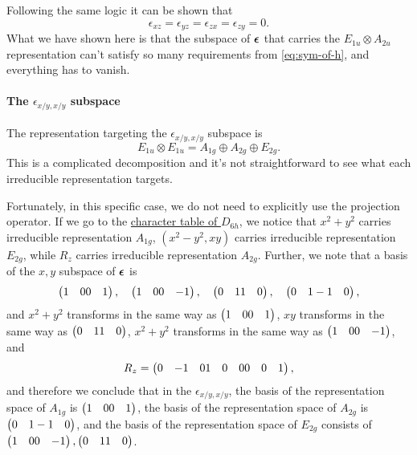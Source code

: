 \documentclass[hyperref, a4paper, 12pt]{article}
\def\\{}%
\begin{document}
Following the same logic it can be shown that 
\begin{equation}
    \epsilon_{xz} = \epsilon_{yz} = \epsilon_{zx} = \epsilon_{zy} = 0.
\end{equation}
What we have shown here is that the subspace of $\vb*{\epsilon}$ that carries the 
$E_{1u} \otimes A_{2u}$ representation can't satisfy so many requirements from \eqref{eq:sym-of-h},
and everything has to vanish.

\paragraph*{The $\epsilon_{x/y, x/y}$ subspace}

The representation targeting the $\epsilon_{x/y, x/y}$ subspace is 
\begin{equation}
    E_{1u} \otimes E_{1u} = A_{1g} \oplus A_{2g} \oplus E_{2g}.
\end{equation}
This is a complicated decomposition and it's not straightforward
to see what each irreducible representation targets.

Fortunately, in this specific case, we do not need to explicitly use the projection operator.
If we go to the \href{http://symmetry.constructor.university/cgi-bin/group.cgi?group=606&option=4}{character table of $D_{6h}$},
we notice that $x^2 + y^2$ carries irreducible representation $A_{1g}$,
$(x^2 - y^2, xy)$ carries irreducible representation $E_{2g}$,
while $R_z$ carries irreducible representation $A_{2g}$.
Further, we note that a basis of the $x, y$ subspace of $\vb*{\epsilon}$ is 
\[
    \pmqty{1 & 0 \\ 0 & 1}, \quad \pmqty{1 & 0 \\ 0 & -1}, \quad 
    \pmqty{0 & 1 \\ 1 & 0}, \quad \pmqty{0 & 1 \\ -1 & 0},
\]
and $x^2 + y^2$ transforms in the same way as $\pmqty{1 & 0 \\ 0 & 1}$,
$xy$ transforms in the same way as $\pmqty{0 & 1 \\ 1 & 0}$,
$x^2 + y^2$ transforms in the same way as $\pmqty{1 & 0 \\ 0 & -1}$,
and 
\begin{equation}
    R_z = \pmqty{0 & -1 & 0 \\ 1 & 0 & 0 \\ 0 & 0 & 1},
\end{equation}
and therefore we conclude that in the $\epsilon_{x/y, x/y}$,
the basis of the representation space of $A_{1g}$ is $\pmqty{1 & 0 \\ 0 & 1}$,
the basis of the representation space of $A_{2g}$ is $\pmqty{0 & 1 \\ -1 & 0}$,
and the basis of the representation space of $E_{2g}$ consists of
$\pmqty{1 & 0 \\ 0 & -1}, \pmqty{0 & 1 \\ 1 & 0}$.
\end{document}
